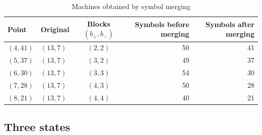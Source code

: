 \documentclass{article}
\theoremstyle{definition}
\theoremstyle{remark}
\begin{document}
\begin{table}[tb]
\centering
\caption{Machines obtained by symbol merging}
\label{tab:merge}
\small
\begin{tabular}{llcrr}
\toprule
Point & Original & Blocks $(b_+,b_-)$ & Symbols before merging & Symbols after merging \\
\midrule
$(4,41)$ & $(13,7)$ & $(2,2)$ & 50 & 41 \\
$(5,37)$ & $(13,7)$ & $(3,2)$ & 49 & 37 \\
$(6,30)$ & $(13,7)$ & $(3,3)$ & 54 & 30 \\
$(7,28)$ & $(13,7)$ & $(4,3)$ & 50 & 28 \\
$(8,21)$ & $(13,7)$ & $(4,4)$ & 40 & 21 \\
\bottomrule
\end{tabular}
\end{table}

\subsection{Three states}
\label{sec:three}
\end{document}
